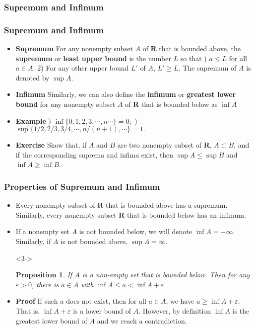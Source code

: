 \documentclass[handout]{beamer}
\newtheorem{Proposition}[theorem]{Proposition}
\begin{document}
\subsubsection{Supremum and Infimum}

\frame
{
  \frametitle{Supremum and Infimum}

  \begin{itemize}
  \item <1->  \textbf{Supremum} For any nonempty subset $A$ of $\mathbf{R}$ that is bounded above, the \textbf{supremum} or \textbf{least upper bound} is the number $L$ so that ) $a\leq L$ for all $a\in A$. 2) For any other upper bound $L'$ of $A$, $L'\geq L$. The supremum of $A$ is denoted by $\sup A$.

  \item <2->  \textbf{Infimum} Similarly, we can also define the \textbf{infimum} or \textbf{greatest lower bound} for any nonempty subset $A$ of $\mathbf{R}$ that is bounded below as $\inf A$ 
  
        \item<3-> \textbf{Example} ) $\inf \{0,1,2,3,\cdots,n\cdots\}=0;$  ) $\sup \{1/2,2/3,3/4,\cdots,n/(n+1), \cdots\}=1.$

        \item<4-> \textbf{Exercise} Show that, if $A$ and $B$ are two nonempty subset of $\mathbf{R}$, $A\subset B$, and if the corresponding suprema and infima exist, then $\sup A\leq \sup B$ and $\inf A\geq \inf B$.
        

        
  \end{itemize}
}



\frame
{
  \frametitle{Properties of Supremum and Infimum}

  \begin{itemize}
  
\item<1-> Every nonempty subset of $\mathbf{R}$ that is bounded above has a supremum. Similarly, every nonempty subset $\mathbf{R}$ that is bounded below has an infimum.

  
     \item <2-> If a nonempty set $A$ is not bounded below, we will denote $\inf A=-\infty$. Similarly, if $A$ is not bounded above, $\sup A=\infty$. 
   \item [] <3-> \begin{Proposition} If $A$ is a non-empty set that is bounded below. Then for any $\varepsilon>0$, there is $a\in A$ with $\inf A\leq a<\inf A+\varepsilon$\end{Proposition} 

  \item <4->  \textbf{Proof} If such $a$ does not exist, then for all $a\in A$, we have $a\geq \inf A+\varepsilon$. That is, $\inf A+\varepsilon$ is a lower bound of $A$. However, by definition $\inf A$ is the greatest lower bound of $A$ and we reach a contradiction.   
        
  \end{itemize}
}
\end{document}
